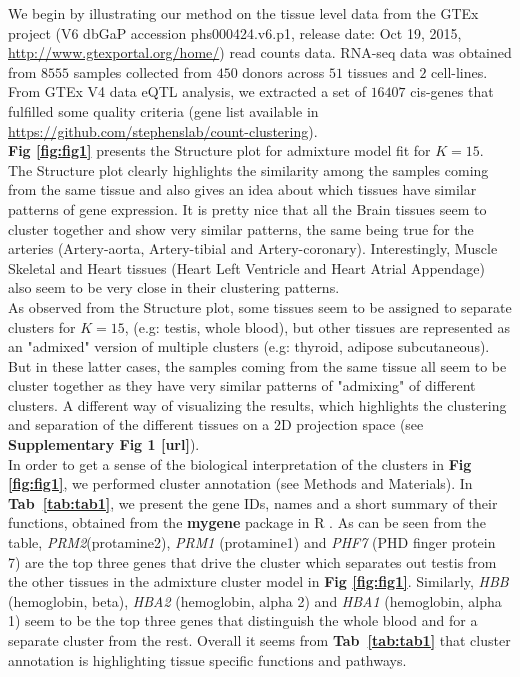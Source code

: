 We begin by illustrating our method on the tissue level data from the  GTEx project (V6 dbGaP accession phs000424.v6.p1, release date: Oct 19, 2015, \url{http://www.gtexportal.org/home/}) read counts data.  RNA-seq data was obtained from $8555$ samples collected from $450$ donors across $51$ tissues and $2$ cell-lines. From GTEx V4 data eQTL analysis, we extracted a set of $16407$ cis-genes that fulfilled some quality criteria (gene list available in \url{https://github.com/stephenslab/count-clustering}).  \\[1 pt]
 \textbf{Fig \ref{fig:fig1}} presents the Structure plot for admixture model fit for $K=15$. The Structure plot clearly highlights the similarity among the samples coming from the same tissue and also gives an idea about which tissues have similar patterns of gene expression. It is  pretty nice that all the Brain tissues seem to cluster together and show very similar patterns, the same being true for the arteries (Artery-aorta, Artery-tibial and Artery-coronary). Interestingly, Muscle Skeletal and Heart tissues (Heart Left Ventricle and Heart Atrial Appendage) also seem to be very close in their clustering patterns. \\[1 pt]
 As observed from the Structure plot, some tissues seem to be assigned to separate clusters for $K=15$, (e.g: testis, whole blood), but other tissues are represented as an "admixed" version of multiple clusters (e.g: thyroid, adipose subcutaneous). But in these latter cases, the samples coming from the same tissue all seem to be cluster together as they have very similar patterns of "admixing" of different clusters. A different way of visualizing the results, which highlights the clustering and separation of the different tissues on a 2D projection space (see \textbf{Supplementary Fig 1 [url]}). \\[1 pt]
 In order to get a sense of the biological interpretation of the clusters in  \textbf{Fig \ref{fig:fig1}}, we performed cluster annotation (see Methods and Materials). In \textbf{Tab~\ref{tab:tab1}}, we present the gene IDs, names and a short summary of their functions, obtained from the \textbf{mygene} package in R \cite{Thompson2014}. As can be seen from the table, \textit{PRM2}(protamine2), \textit{PRM1} (protamine1) and \textit{PHF7} (PHD finger protein 7) are the  top three genes that drive the cluster which separates out testis from the other tissues in the admixture cluster model in \textbf{Fig \ref{fig:fig1}}. Similarly, \textit{HBB} (hemoglobin, beta), \textit{HBA2} (hemoglobin, alpha 2) and \textit{HBA1} (hemoglobin, alpha 1) seem to be the top three genes that distinguish the whole blood and for a separate cluster from the rest. Overall it seems from \textbf{Tab~\ref{tab:tab1}} that cluster annotation is highlighting tissue specific functions and pathways.\\[2 pt]

